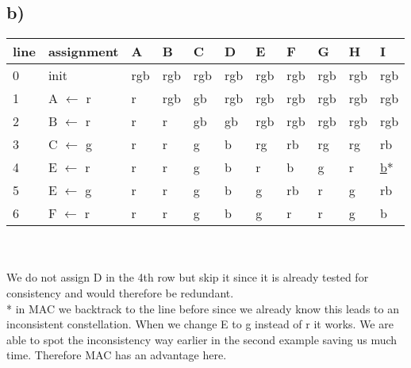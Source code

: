 \documentclass[a4paper]{article}
\begin{document}
	\subsection*{b)}
	\begin{tabular}{l | l || l | l | l | l | l | l | l | l | l }
		line & assignment & A & B & C & D & E & F & G & H & I  \\ \hline
		0 & init & rgb & rgb & rgb & rgb & rgb & rgb & rgb & rgb & rgb \\ \hline
		1 & A $\leftarrow$ r & r  & rgb & gb & rgb & rgb & rgb & rgb & rgb & rgb\\ \hline
		2 & B $\leftarrow$ r & r & r & gb & gb & rgb & rgb & rgb & rgb & rgb\\ \hline
		3 & C $\leftarrow$ g & r & r & g & b & rg & rb & rg & rg & rb \\ \hline
		4 & E $\leftarrow$ r & r & r & g & b & r & b & g & r & \underline{b}* \\ \hline
		5 & E $\leftarrow$ g & r & r & g & b & g & rb & r & g & rb \\  \hline
		6 & F $\leftarrow$ r & r & r & g & b & g & r & r & g & b \\ \hline
	\end{tabular}\\ \\
	We do not assign D in the 4th row  but skip it since it is already tested for consistency and would therefore be redundant.\\
	* in MAC we backtrack to the line before since we already know this leads to an inconsistent constellation. When we change E to g instead of r it works.	
	We are able to spot the inconsistency way earlier in the second example saving us much time. Therefore MAC has an advantage here.
\end{document}
